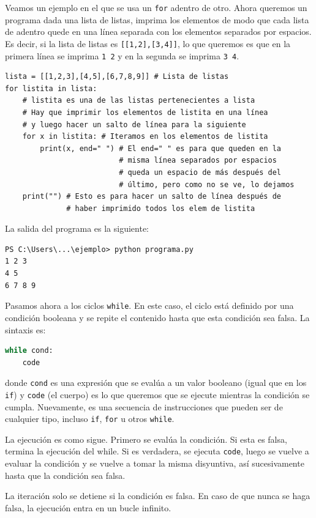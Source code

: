 \documentclass[a4paper, 12pt]{report}
\theoremstyle{definition}
\begin{document}
Veamos un ejemplo en el que se usa un {\tt for} adentro de otro. Ahora queremos un programa dada una lista de listas, imprima los elementos de modo que cada lista de adentro quede en una línea separada con los elementos separados por espacios. Es decir, si la lista de listas es {\tt [[1,2],[3,4]]}, lo que queremos es que en la primera línea se imprima {\tt 1 2} y en la segunda se imprima {\tt 3 4}.
\begin{verbatim}
lista = [[1,2,3],[4,5],[6,7,8,9]] # Lista de listas
for listita in lista:
    # listita es una de las listas pertenecientes a lista
    # Hay que imprimir los elementos de listita en una línea
    # y luego hacer un salto de línea para la siguiente
    for x in listita: # Iteramos en los elementos de listita
        print(x, end=" ") # El end=" " es para que queden en la
                          # misma línea separados por espacios
                          # queda un espacio de más después del 
                          # último, pero como no se ve, lo dejamos
    print("") # Esto es para hacer un salto de línea después de
              # haber imprimido todos los elem de listita 
\end{verbatim}
La salida del programa es la siguiente:
\begin{verbatim}
PS C:\Users\...\ejemplo> python programa.py
1 2 3
4 5
6 7 8 9
\end{verbatim}

Pasamos ahora a los ciclos {\tt while}. En este caso, el ciclo está definido por una condición booleana y se repite el contenido hasta que esta condición sea falsa. La sintaxis es:
\begin{lstlisting}[language=python]
while cond:
    code
\end{lstlisting}
donde {\tt cond} es una expresión que se evalúa a un valor booleano (igual que en los {\tt if}) y {\tt code} (el cuerpo) es lo que queremos que se ejecute mientras la condición se cumpla. Nuevamente, es una secuencia de instrucciones que pueden ser de cualquier tipo, incluso {\tt if}, {\tt for} u otros {\tt while}.

La ejecución es como sigue. Primero se evalúa la condición. Si esta es falsa, termina la ejecución del while. Si es verdadera, se ejecuta {\tt code}, luego se vuelve a evaluar la condición y se vuelve a tomar la misma disyuntiva, así sucesivamente hasta que la condición sea falsa.

La iteración solo se detiene si la condición es falsa. En caso de que nunca se haga falsa, la ejecución entra en un bucle infinito.
\end{document}
